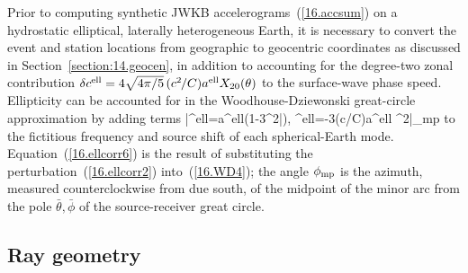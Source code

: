 \en
Prior to computing synthetic JWKB accelerograms~(\ref{16.accsum})
on a hydrostatic elliptical, laterally heterogeneous Earth, it is necessary
to convert the event and station locations from geographic to
geocentric coordinates as discussed in Section~\ref{section:14.geocen},
in addition to accounting for the degree-two zonal contribution
$\delta c^{\rm ell}=4\sqrt{4\pi/5}\,
(c^2\hspace{-0.3 mm}/C) a^{\rm ell}X_{20}(\theta)$
to the surface-wave phase speed.
Ellipticity can be accounted for in the Woodhouse-Dziewonski
great-circle approximation by adding terms
\eq \label{16.ellcorr5}
\delta\bar{\om}^{\rm ell}=\om a^{\rm ell}(1-3\cos^2\bar{\theta}),
\en
\eq \label{16.ellcorr6}
\delta\Theta^{\rm ell}=-3(c/C)a^{\rm ell}\sin\Theta
\sin^2\bar{\theta}\phi_{\rm mp}
\en
to the fictitious frequency and source shift of each
spherical-Earth mode.  Equation~(\ref{16.ellcorr6}) is the
result of substituting the perturbation~(\ref{16.ellcorr2})
into~(\ref{16.WD4}); the angle $\phi_{\rm mp}$ is the
azimuth, measured counterclockwise from due south,
of the midpoint of the minor arc from the pole
$\bar{\theta},\bar{\phi}$ of the source-receiver
great circle.
%

\renewcommand{\thesubsection}{$\!\!\!\raise1.3ex\hbox{$\star$}\!\!$
\arabic{chapter}.\arabic{section}.\arabic{subsection}}
\subsection{Ray geometry}
%
\renewcommand{\thesubsection}{\arabic{chapter}.\arabic{section}.\arabic{subsection}}

